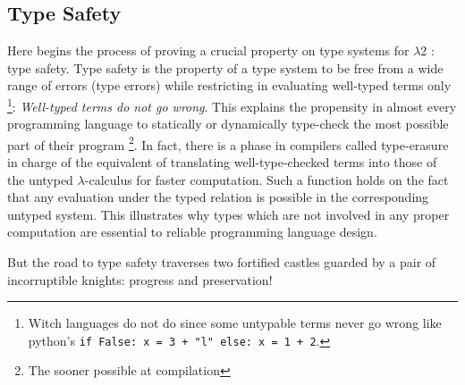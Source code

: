 \documentclass{article}
\begin{document}
    \subsection{Type Safety}
    Here begins the process of proving a crucial property on type systems for $\lambda$2 : type safety. Type safety is the property of a type system to be free from a wide range of errors (type errors) while restricting in evaluating well-typed terms only
    \footnote{Witch languages do not do since some untypable terms never go wrong like python's \texttt{if False: x = 3 + "l" else: x = 1 + 2}.}: \textit{Well-typed terms do not go wrong}.
    This explains the propensity in almost every programming language to statically or dynamically type-check the most possible part of their program \footnote{The sooner possible at compilation}. In fact, there is a phase in compilers called type-erasure in charge of the equivalent of translating well-type-checked terms into those of the untyped $\lambda$-calculus for faster computation. Such a function holds on the fact that any evaluation under the typed relation is possible in the corresponding untyped system. This illustrates why types which are not involved in any proper computation are essential to reliable programming language design.\par
    But the road to type safety traverses two fortified castles guarded by a pair of incorruptible knights: progress and preservation!
\end{document}
